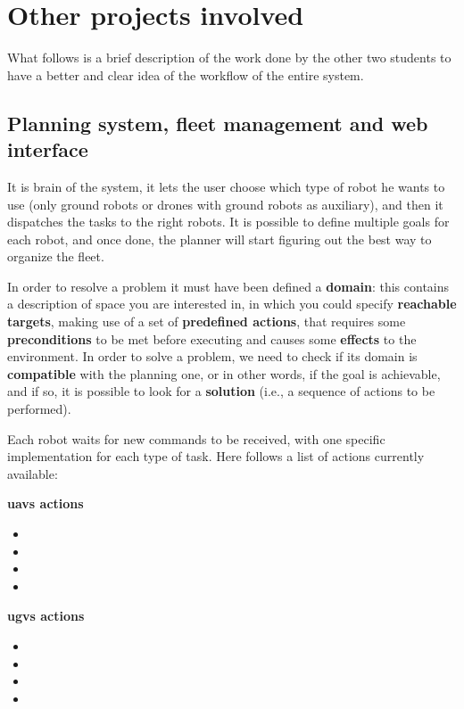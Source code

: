 \section{Other projects involved}

What follows is a brief description of the work done by the other two students to have a better and clear idea of the workflow of the entire system.

\subsection{Planning system, fleet management and web interface}
\label{sub:planning}

It is brain of the system, it lets the user choose which type of robot he wants to use (only ground robots or drones with ground robots as auxiliary), and then it dispatches the tasks to the right robots. It is possible to define multiple goals for each robot, and once done, the planner will start figuring out the best way to organize the fleet.

In order to resolve a problem it must have been defined a \textbf{domain}: this contains a description of space you are interested in, in which you could specify \textbf{reachable targets}, making use of a set of \textbf{predefined actions}, that requires some \textbf{preconditions} to be met before executing and causes some \textbf{effects} to the environment. In order to solve a problem, we need to check if its domain is \textbf{compatible} with the planning one, or in other words, if the goal is achievable, and if so, it is possible to look for a \textbf{solution} (i.e., a sequence of actions to be performed).

Each robot waits for new commands to be received, with one specific implementation for each type of task. Here follows a list of actions currently available:

\bigskip

\begin{minipage}[h]{0.45\textwidth}
  \centering
  \textbf{\acrshort{uavs} actions}
  \begin{itemize}
    \centering
    \item {}
    \item {}    
    \item {}
    \item {}
  \end{itemize}
\end{minipage}
\begin{minipage}[h]{0.45\textwidth}
  \centering
  \textbf{\acrshort{ugvs} actions}
    \begin{itemize}
      \centering
      \item {}
      \item {}
      \item {}
      \item {}
    \end{itemize}
\end{minipage}

